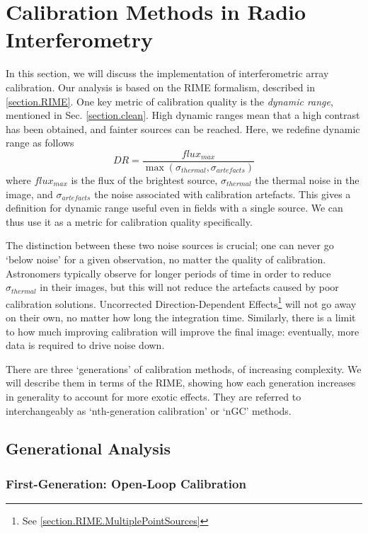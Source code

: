 
\section{Calibration Methods in Radio Interferometry}\label{section.calibration}
\pg
In this section, we will discuss the implementation of interferometric array calibration. Our analysis is based on the RIME formalism, described in \cref{section.RIME}. One key metric of calibration quality is the \emph{dynamic range}, mentioned in Sec. \ref{section.clean}. High dynamic ranges mean that a high contrast has been obtained, and fainter sources can be reached. Here, we redefine dynamic range as follows
\begin{equation}\label{eq.DR}
DR = \frac{flux_{max}}{\max(\sigma_{thermal},\sigma_{artefacts})}
\end{equation}
where $flux_{max}$ is the flux of the brightest source, $\sigma_{thermal}$ the thermal noise in the image, and $\sigma_{artefacts}$ the noise associated with calibration artefacts. This gives a definition for dynamic range useful even in fields with a single source. We can thus use it as a metric for calibration quality specifically.

\pg
The distinction between these two noise sources is crucial; one can never go `below noise' for a given observation, no matter the quality of calibration. Astronomers typically observe for longer periods of time in order to reduce $\sigma_{thermal}$ in their images, but this will not reduce the artefacts caused by poor calibration solutions. Uncorrected Direction-Dependent Effects\footnote{See \cref{section.RIME.MultiplePointSources}} will not go away on their own, no matter how long the integration time. Similarly, there is a limit to how much improving calibration will improve the final image: eventually, more data is required to drive noise down.

\pg
There are three `generations' of calibration methods, of increasing complexity. We will describe them in terms of the RIME, showing how each generation increases in generality to account for more exotic effects. They are referred to interchangeably as `nth-generation calibration' or `nGC' methods.

\subsection{Generational Analysis}

\subsubsection{First-Generation: Open-Loop Calibration}\label{section.calibration.1gc}

